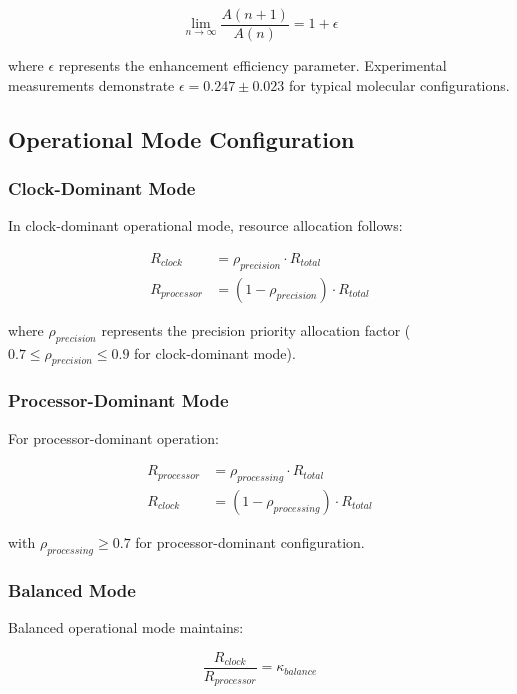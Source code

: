\begin{equation}
\lim_{n \to \infty} \frac{A(n+1)}{A(n)} = 1 + \epsilon
\end{equation}

where $\epsilon$ represents the enhancement efficiency parameter. Experimental measurements demonstrate $\epsilon = 0.247 \pm 0.023$ for typical molecular configurations.

\subsection{Operational Mode Configuration}

\subsubsection{Clock-Dominant Mode}

In clock-dominant operational mode, resource allocation follows:

\begin{align}
R_{clock} &= \rho_{precision} \cdot R_{total} \\
R_{processor} &= (1 - \rho_{precision}) \cdot R_{total}
\end{align}

where $\rho_{precision}$ represents the precision priority allocation factor ($0.7 \leq \rho_{precision} \leq 0.9$ for clock-dominant mode).

\subsubsection{Processor-Dominant Mode}

For processor-dominant operation:

\begin{align}
R_{processor} &= \rho_{processing} \cdot R_{total} \\
R_{clock} &= (1 - \rho_{processing}) \cdot R_{total}
\end{align}

with $\rho_{processing} \geq 0.7$ for processor-dominant configuration.

\subsubsection{Balanced Mode}

Balanced operational mode maintains:

\begin{equation}
\frac{R_{clock}}{R_{processor}} = \kappa_{balance}
\end{equation}

